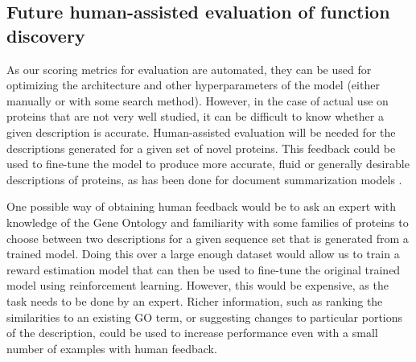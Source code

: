 \documentclass{specification}
\begin{document}
\subsection{Future human-assisted evaluation of function discovery}
As our scoring metrics for evaluation are automated, they can be used for optimizing the architecture and other hyperparameters of the model (either manually or with some search method).
However, in the case of actual use on proteins that are not very well studied, it can be difficult to know whether a given description is accurate.
Human-assisted evaluation will be needed for the descriptions generated for a given set of novel proteins.
This feedback could be used to fine-tune the model to produce more accurate, fluid or generally desirable descriptions of proteins, as has been done for document summarization models \cite{finetuningWithHuman, learningToSummarize}.

One possible way of obtaining human feedback would be to ask an expert with knowledge of the Gene Ontology and familiarity with some families of proteins to choose between two descriptions for a given sequence set that is generated from a trained model.
Doing this over a large enough dataset would allow us to train a reward estimation model that can then be used to fine-tune the original trained model using reinforcement learning.
However, this would be expensive, as the task needs to be done by an expert.
Richer information, such as ranking the similarities to an existing GO term, or suggesting changes to particular portions of the description, could be used to increase performance even with a small number of examples with human feedback.

\printbibliography
\end{document}
